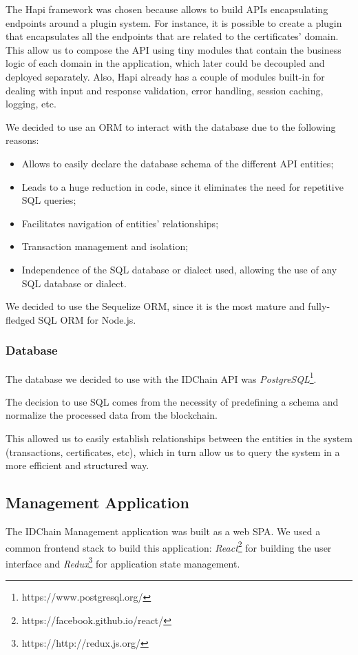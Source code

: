 The Hapi framework was chosen because allows to build APIs encapsulating endpoints around a plugin system.
For instance, it is possible to create a plugin that encapsulates all the endpoints that are related to the certificates' domain.
This allow us to compose the API using tiny modules that contain the business logic of each domain in the application, which later could be decoupled and deployed separately.
Also, Hapi already has a couple of modules built-in for dealing with input and response validation, error handling, session caching, logging, etc.

We decided to use an \ac{ORM} to interact with the database due to the following reasons:

\begin{itemize}
  \item Allows to easily declare the database schema of the different API entities;
  \item Leads to a huge reduction in code, since it eliminates the need for repetitive SQL queries;
  \item Facilitates navigation of entities' relationships;
  \item Transaction management and isolation;
  \item Independence of the SQL database or dialect used, allowing the use of any SQL database or dialect.
\end{itemize}

We decided to use the Sequelize ORM, since it is the most mature and fully-fledged SQL ORM for Node.js.

\subsubsection{Database}

The database we decided to use with the IDChain API was \textit{PostgreSQL}\footnote{https://www.postgresql.org/}.

The decision to use SQL comes from the necessity of predefining a schema and normalize the processed data from the blockchain.

This allowed us to easily establish relationships between the entities in the system (transactions, certificates, etc), which in turn allow us to query the system in a more efficient and structured way.

\subsection{Management Application}
The IDChain Management application was built as a web \ac{SPA}.
We used a common frontend stack to build this application: \textit{React}\footnote{https://facebook.github.io/react/} for building the user interface and \textit{Redux}\footnote{https://http://redux.js.org/} for application state management.

